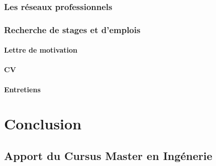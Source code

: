 \documentclass[a4paper]{report}
\begin{document}
\section{Les réseaux professionnels}
\section{Recherche de stages et d'emplois}
\subsection{Lettre de motivation}
\subsection{CV}
\subsection{Entretiens}

\part{Conclusion}
\chapter{Apport du Cursus Master en Ingénerie}
\end{document}
